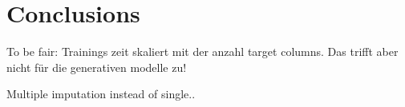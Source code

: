 
\section{Conclusions}


To be fair: Trainings zeit skaliert mit der anzahl target columns. Das trifft aber nicht für die generativen modelle zu!

Multiple imputation instead of single..
